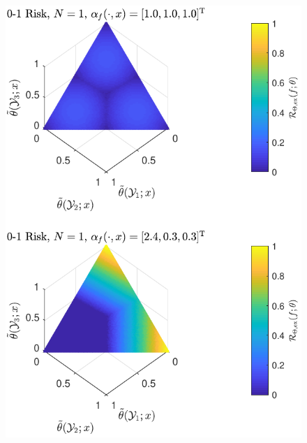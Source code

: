 \documentclass{beamer}
\begin{document}
\begin{frame}
\begin{columns}[c]
\begin{column}{.5\linewidth}
\begin{figure}
\centering
\includegraphics[width=1\linewidth]{Risk_cond_ex_01_Dir_theta_sub_mu.pdf}
\label{fig:Risk_cond_ex_01_Dir_theta_sub_mu}
\end{figure}

\end{column}

\end{columns}

\end{frame}
\end{document}
